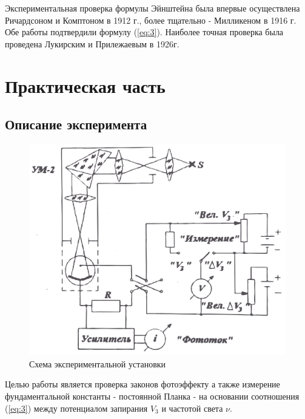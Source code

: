 Экспериментальная проверка формулы Эйнштейна была впервые осуществлена Ричардсоном и Комптоном в 1912 г., более тщательно - Милликеном в 1916 г. Обе работы подтвердили формулу (\ref{eq:3}). Наиболее точная проверка была проведена Лукирским и Прилежаевым в 1926г.

\section{Практическая часть}
\subsection{Описание эксперимента}
\begin{figure}[h!]
	\centering
	\includegraphics[width=\linewidth]{fig/fig2.png}
	\caption{Схема экспериментальной установки}
	\label{fig:2}
\end{figure}

Целью работы является проверка законов фотоэффекту а также измерение фундаментальной константы - постоянной Планка - на основании соотношения (\ref{eq:3}) между потенциалом запирания $V_{3}$ и частотой света $\nu$.

